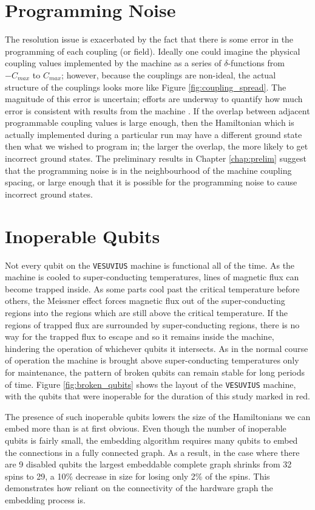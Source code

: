 \section{Programming Noise}
\label{sec:noise}
The resolution issue is exacerbated by the fact that there is some error in the programming of each coupling (or field).  Ideally one could imagine the physical coupling values implemented by the machine as a series of $\delta$-functions from $-C_{max}$ to $C_{max}$; however, because the couplings are non-ideal, the actual structure of the couplings looks more like Figure \ref{fig:coupling_spread}.  The magnitude of this error is uncertain; efforts are underway to quantify how much error is consistent with results from the machine \cite{aaron}.  If the overlap between adjacent programmable coupling values is large enough, then the Hamiltonian which is actually implemented during a particular run may have a different ground state then what we wished to program in; the larger the overlap, the more likely to get incorrect ground states.  The preliminary results in Chapter \ref{chap:prelim} suggest that the programming noise is in the neighbourhood of the machine coupling spacing, or large enough that it is possible for the programming noise to cause incorrect ground states.

\section{Inoperable Qubits}
\label{sec:inop_qubits}
Not every qubit on the \texttt{VESUVIUS} machine is functional all of the time.  As the machine is cooled to super-conducting temperatures, lines of magnetic flux can become trapped inside.  As some parts cool past the critical temperature before others, the Meissner effect forces magnetic flux out of the super-conducting regions into the regions which are still above the critical temperature.  If the regions of trapped flux are surrounded by super-conducting regions, there is no way for the trapped flux to escape and so it remains inside the machine, hindering the operation of whichever qubits it intersects.  As in the normal course of operation the machine is brought above super-conducting temperatures only for maintenance, the pattern of broken qubits can remain stable for long periods of time.  Figure \ref{fig:broken_qubits} shows the layout of the \texttt{VESUVIUS} machine, with the qubits that were inoperable for the duration of this study marked in red.

The presence of such inoperable qubits lowers the size of the Hamiltonians we can embed more than is at first obvious.  Even though the number of inoperable qubits is fairly small, the embedding algorithm requires many qubits to embed the connections in a fully connected graph.  As a result, in the case where there are 9 disabled qubits the largest embeddable complete graph shrinks from 32 spins to 29, a 10\% decrease in size for losing only 2\% of the spins.  This demonstrates how reliant on the connectivity of the hardware graph the embedding process is.

